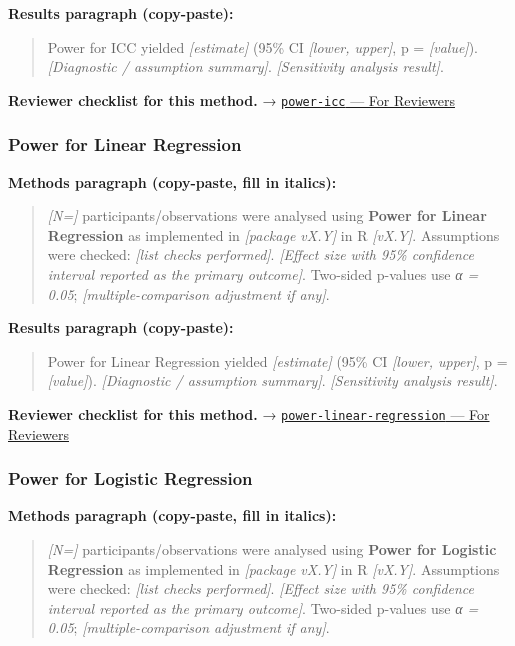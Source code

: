 \documentclass[
]{article}
\begin{document}
\textbf{Results paragraph (copy-paste):}

\begin{quote}
Power for ICC yielded \emph{{[}estimate{]}} (95\% CI \emph{{[}lower,
upper{]}}, p = \emph{{[}value{]}}). \emph{{[}Diagnostic / assumption
summary{]}}. \emph{{[}Sensitivity analysis result{]}}.
\end{quote}

\textbf{Reviewer checklist for this method.} →
\href{../chapters/05-power/power-icc.Rmd\#for-reviewers}{\texttt{power-icc}
--- For Reviewers}

\subsubsection{Power for Linear
Regression}\label{power-for-linear-regression}

\textbf{Methods paragraph (copy-paste, fill in italics):}

\begin{quote}
\emph{{[}N={]}} participants/observations were analysed using
\textbf{Power for Linear Regression} as implemented in \emph{{[}package
vX.Y{]}} in R \emph{{[}vX.Y{]}}. Assumptions were checked: \emph{{[}list
checks performed{]}}. \emph{{[}Effect size with 95\% confidence interval
reported as the primary outcome{]}}. Two-sided p-values use \emph{α =
0.05}; \emph{{[}multiple-comparison adjustment if any{]}}.
\end{quote}

\textbf{Results paragraph (copy-paste):}

\begin{quote}
Power for Linear Regression yielded \emph{{[}estimate{]}} (95\% CI
\emph{{[}lower, upper{]}}, p = \emph{{[}value{]}}). \emph{{[}Diagnostic
/ assumption summary{]}}. \emph{{[}Sensitivity analysis result{]}}.
\end{quote}

\textbf{Reviewer checklist for this method.} →
\href{../chapters/05-power/power-linear-regression.Rmd\#for-reviewers}{\texttt{power-linear-regression}
--- For Reviewers}

\subsubsection{Power for Logistic
Regression}\label{power-for-logistic-regression}

\textbf{Methods paragraph (copy-paste, fill in italics):}

\begin{quote}
\emph{{[}N={]}} participants/observations were analysed using
\textbf{Power for Logistic Regression} as implemented in
\emph{{[}package vX.Y{]}} in R \emph{{[}vX.Y{]}}. Assumptions were
checked: \emph{{[}list checks performed{]}}. \emph{{[}Effect size with
95\% confidence interval reported as the primary outcome{]}}. Two-sided
p-values use \emph{α = 0.05}; \emph{{[}multiple-comparison adjustment if
any{]}}.
\end{quote}
\end{document}
